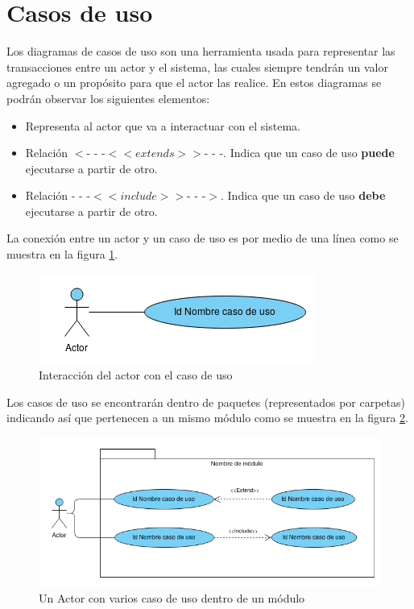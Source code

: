 \section{Casos de uso}


%
%
%

Los diagramas de casos de uso son una herramienta usada para representar las transacciones entre un actor y el sistema, las cuales siempre tendrán un valor agregado o un propósito para que el actor las realice.
En estos diagramas se podrán observar los siguientes elementos:

\begin{itemize}
	 \UCpaso Representa al sistema mediante un óvalo.
	\item \UCactor Representa al actor que va a interactuar con el sistema.
	\item Relación $<$- - -$<<extends>>$- - -. Indica que un caso de uso \textbf{puede} ejecutarse a partir de otro.
	\item Relación - - -$<<include>>$- - -$>$. Indica que un caso de uso \textbf{debe} ejecutarse a partir de otro.
\end{itemize}

La conexión entre un actor y un caso de uso es por medio de una línea como se muestra en la figura \ref{fig:acUC}.

\begin{figure}[hbtp!]
	\begin{center}
		\includegraphics[width=.4\textwidth]{LIT/ActorUC}
	\end{center}
	\label{fig:acUC}
	\caption{Interacción del actor con el caso de uso}
\end{figure}

Los casos de uso se encontrarán dentro de paquetes (representados por carpetas) indicando así que pertenecen a un mismo módulo como se muestra en la figura \ref{fig:pack}.

\begin{figure}[hbtp!]
	\begin{center}
		\includegraphics[width=.7\textwidth]{LIT/Paquete}
	\end{center}
	\label{fig:pack}
	\caption{Un Actor con varios caso de uso dentro de un módulo}
\end{figure}

